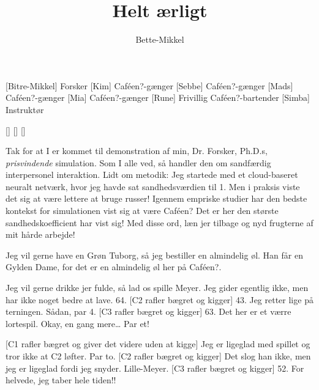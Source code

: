 \documentclass[a4paper,11pt]{article}
\title{Helt ærligt}
\author{Bette-Mikkel}
\begin{document}
\maketitle

\begin{roles}
[Bitre-Mikkel] Forsker
[Kim] Caféen?-gænger
[Sebbe] Caféen?-gænger
[Mads] Caféen?-gænger
[Mia] Caféen?-gænger
[Rune] Frivillig Caféen?-bartender
[Simba] Instruktør
\end{roles}

\begin{props}
    []
    []
    []
\end{props}


\begin{sketch}
     Tak for at I er kommet til demonstration af min, Dr. Forsker, Ph.D.s, \emph{prisvindende} simulation.
    Som I alle ved, så handler den om sandfærdig interpersonel interaktion. Lidt om metodik: Jeg startede
    med et cloud-baseret neuralt netværk, hvor jeg havde sat sandhedsværdien til 1. Men i praksis viste det sig at være
    lettere at bruge russer! Igennem empriske studier har den bedste kontekst for simulationen vist sig at være Caféen?
    Det er her den største sandhedskoefficient har vist sig! Med disse ord, læn jer tilbage og nyd frugterne af mit hårde
    arbejde! 

     Jeg vil gerne have en Grøn Tuborg, så jeg bestiller en almindelig øl.
     Han får en Gylden Dame, for det er en almindelig øl her på Caféen?.

     Jeg vil gerne drikke jer fulde, så lad os spille Meyer.
     Jeg gider egentlig ikke, men har ikke noget bedre at lave.  64.
    [C2 rafler bægret og kigger] 43. Jeg retter lige på terningen. Sådan, par 4.
    [C3 rafler bægret og kigger] 63. Det her er et værre lortespil.  Okay, en gang mere\ldots
         Par et!

    [C1 rafler bægret og giver det videre uden at kigge] Jeg er ligeglad med spillet og tror ikke at C2 løfter. Par to.
    [C2 rafler bægret og kigger] Det slog han ikke, men jeg er ligeglad fordi jeg snyder. Lille-Meyer.
    [C3 rafler bægret og kigger] 52. For helvede, jeg taber hele tiden!! 


\end{sketch}
\end{document}

